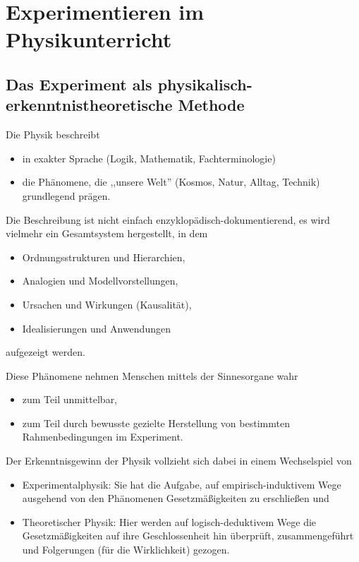 \chapter{Experimentieren im Physikunterricht}\label{Experiment}

\section{Das Experiment als physikalisch-
                         erkenntnistheoretische Methode}

Die Physik beschreibt
\begin{itemize}
	\item
	in exakter Sprache (Logik, Mathematik, Fachterminologie)
	\item
	die Ph\"{a}nomene, die ,,unsere Welt'' (Kosmos, Natur,
	Alltag, Technik) grundlegend pr\"{a}gen.
\end{itemize}

Die Beschreibung ist nicht einfach enzyklop\"{a}disch-dokumentierend,
es wird vielmehr ein Gesamtsystem hergestellt, in dem
\begin{itemize}
	\item
	Ordnungsstrukturen und Hierarchien,
	\item
	Analogien und Modellvorstellungen,
	\item
	Ursachen und Wirkungen (Kausalit\"{a}t),
	\item
	Idealisierungen und Anwendungen
\end{itemize}
aufgezeigt werden.

Diese Ph\"{a}nomene nehmen Menschen mittels der Sinnesorgane wahr
\begin{itemize}
	\item
	zum Teil unmittelbar,
	\item
	zum Teil durch bewusste gezielte Herstellung von bestimmten
	Rahmenbedingungen im Experiment.
\end{itemize}

Der Erkenntnisgewinn der Physik vollzieht sich dabei in einem
Wechselspiel von
\begin{itemize}
	\item
	Experimentalphysik: Sie hat die Aufgabe, auf
	empirisch-induktivem Wege ausgehend von den Ph\"{a}nomenen
	Gesetzm\"{a}{\ss}igkeiten zu erschlie{\ss}en und
	\item
	Theoretischer Physik:
	Hier werden auf logisch-deduktivem Wege die Gesetzm\"{a}{\ss}igkeiten
	auf ihre Geschlossenheit hin \"{u}berpr\"{u}ft, zusammengef\"{u}hrt und
	Folgerungen (f\"{u}r die Wirklichkeit) gezogen.
\end{itemize}


